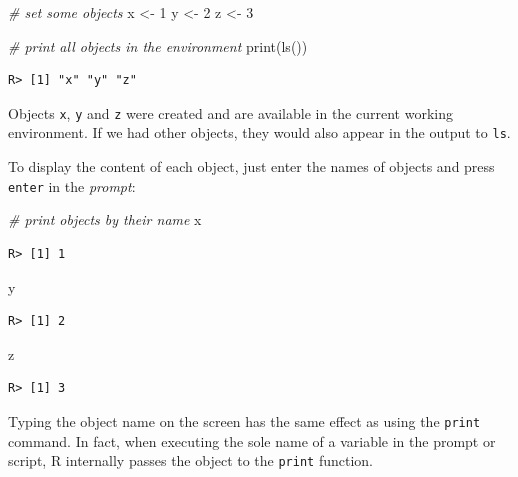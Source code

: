 \documentclass[
  12pt,
]{book}
\newenvironment{Shaded}{\begin{snugshade}}{\end{snugshade}}
\newcommand{\CommentTok}[1]{\textcolor[rgb]{0.37,0.37,0.37}{\textit{#1}}}
\newcommand{\DecValTok}[1]{\textcolor[rgb]{0.06,0.06,0.06}{#1}}
\newcommand{\FunctionTok}[1]{\textcolor[rgb]{0,0,0}{#1}}
\newcommand{\NormalTok}[1]{#1}
\newcommand{\OtherTok}[1]{\textcolor[rgb]{0.37,0.37,0.37}{#1}}
\begin{document}
\begin{Shaded}
\begin{Highlighting}[]
\CommentTok{\# set some objects}
\NormalTok{x }\OtherTok{\textless{}{-}} \DecValTok{1}
\NormalTok{y }\OtherTok{\textless{}{-}} \DecValTok{2}
\NormalTok{z }\OtherTok{\textless{}{-}} \DecValTok{3}

\CommentTok{\# print all objects in the environment}
\FunctionTok{print}\NormalTok{(}\FunctionTok{ls}\NormalTok{())}
\end{Highlighting}
\end{Shaded}

\begin{verbatim}
R> [1] "x" "y" "z"
\end{verbatim}

Objects \texttt{x}, \texttt{y} and \texttt{z} were created and are available in the current working environment. If we had other objects, they would also appear in the output to \texttt{ls}.

To display the content of each object, just enter the names of objects and press \texttt{enter} in the \emph{prompt}:

\begin{Shaded}
\begin{Highlighting}[]
\CommentTok{\# print objects by their name}
\NormalTok{x}
\end{Highlighting}
\end{Shaded}

\begin{verbatim}
R> [1] 1
\end{verbatim}

\begin{Shaded}
\begin{Highlighting}[]
\NormalTok{y}
\end{Highlighting}
\end{Shaded}

\begin{verbatim}
R> [1] 2
\end{verbatim}

\begin{Shaded}
\begin{Highlighting}[]
\NormalTok{z}
\end{Highlighting}
\end{Shaded}

\begin{verbatim}
R> [1] 3
\end{verbatim}

Typing the object name on the screen has the same effect as using the \texttt{print} command. In fact, when executing the sole name of a variable in the prompt or script, R internally passes the object to the \texttt{print} function.
\end{document}
